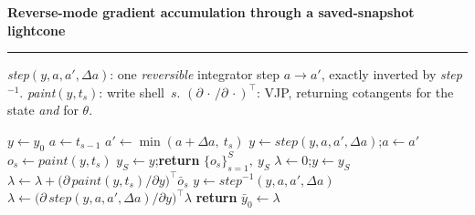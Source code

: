 \documentclass[varwidth=17.5cm, border=8pt]{standalone}
\begin{document}
\begin{minipage}{17cm}
{\bfseries Reverse-mode gradient accumulation through a saved-snapshot lightcone}\\[3pt]
\hrule\vspace{5pt}
{\footnotesize\textit{step}$(y,a,a',\Delta a)$: one \emph{reversible} integrator step $a\!\to\!a'$, exactly inverted by \textit{step}$^{-1}$.\quad
\textit{paint}$(y,t_s)$: write shell~$s$.\quad
$(\partial\,\cdot\,/\partial\,\cdot)^{\!\top}$: VJP, returning cotangents for the state \emph{and} for $\theta$.}\\[5pt]
\begin{algorithmic}[1]
  \State $y \gets y_0$
    \State $a \gets t_{s-1}$
      \State $a' \gets \min(a+\Delta a,\ t_s)$ 
      \State $y \gets \textit{step}(y,a,a',\Delta a)$;\quad $a \gets a'$
    \EndWhile
    \State $o_s \gets \textit{paint}(y,t_s)$ 
  \EndFor
  \State $y_S \gets y$;\quad \textbf{return} $\{o_s\}_{s=1}^{S},\ y_S$ 
\EndProcedure
\vspace{4pt}
  \State $\lambda \gets 0$;\quad $y \gets y_S$ 
    \State $\lambda \gets \lambda + \big(\partial\,\textit{paint}(y,t_s)/\partial y\big)^{\!\top} \bar o_s$ 
    \For{each forward step $a \to a'$ of $(t_{s-1},t_s]$, \textbf{in reverse}}
      \State $y \gets \textit{step}^{-1}(y,a,a',\Delta a)$ 
      \State $\lambda \gets \big(\partial\,\textit{step}(y,a,a',\Delta a)/\partial y\big)^{\!\top} \lambda$ 
    \EndFor
  \EndFor
  \State \textbf{return} $\bar y_0 \gets \lambda$ 
\EndProcedure
\end{algorithmic}
\end{minipage}
\end{document}
